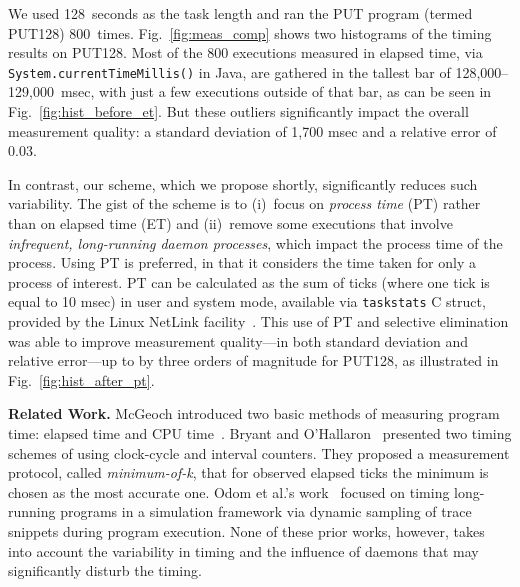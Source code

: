 \documentclass[letter]{ieice}
\begin{document}
We used 128~seconds as the task length and ran the PUT program (termed PUT128) 
800~times. Fig.~\ref{fig:meas_comp} shows two histograms of the timing results on PUT128.
Most of the 800 executions measured in elapsed time, 
via  {\tt System.currentTimeMillis()} in Java, are gathered in the tallest bar 
of \hbox{128,000--129,000 msec,} with just a few executions outside of that bar, as can be seen in Fig.~\ref{fig:hist_before_et}. 
But these outliers significantly impact the overall measurement quality: 
a standard deviation of 1,700 msec and a relative error of 0.03. 

In contrast, our scheme, which we propose shortly, 
significantly reduces such variability.
The gist of the scheme is to (i)~focus on
{\em process time} (PT) rather than on elapsed time (ET) and 
(ii)~remove some executions that involve
{\em infrequent, \hbox{long-running} daemon processes}, which impact
the process time of the process. 
Using PT is preferred, in that it considers 
the time taken for only a process of interest.
PT can be calculated as the sum of ticks (where one tick is equal to 10 msec)
in user and system mode, available via {\tt taskstats} C struct, 
provided by the Linux NetLink facility~\cite{Netlink}.
This use of PT and selective elimination 
was able to improve 
measurement quality---in both standard deviation and relative error---up to by 
three orders of magnitude for PUT128, as illustrated in Fig.~\ref{fig:hist_after_pt}. 

{\bf Related Work.} 
McGeoch introduced
two basic methods of measuring program time: elapsed time and CPU time~\cite{Mcgeoch12}. 
Bryant and O'Hallaron~\cite{Randal03} 
presented two timing schemes of using clock-cycle and interval counters. 
They proposed a measurement protocol, called {\em minimum-of-k}, 
that for observed elapsed ticks the minimum is chosen as the most accurate one. 
Odom et al.'s work~\cite{Odom05} focused on timing long-running programs 
in a simulation framework via dynamic sampling of trace snippets during program execution. 
None of these prior works, however, takes into account the variability in 
timing and the influence of daemons that may significantly disturb the timing.
\end{document}
